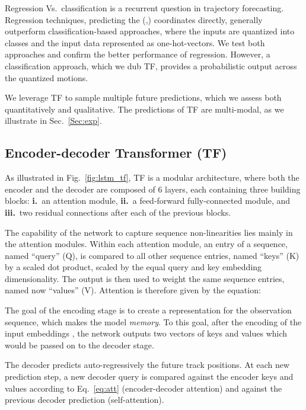 \documentclass[a4paper,conference]{IEEEtran}
\begin{document}
Regression Vs.\ classification is a recurrent question in trajectory forecasting. Regression techniques, predicting the (,) coordinates directly, generally outperform classification-based approaches, where the inputs are quantized into classes and the input data represented as one-hot-vectors. We test both approaches and confirm the better performance of regression. However, a classification approach, which we dub TF, provides a probabilistic output across the quantized motions.

We leverage TF to sample multiple future predictions, which we assess both quantitatively and qualitative. The predictions of TF are multi-modal, as we illustrate in Sec.~\ref{Sec:exp}.










\subsection{Encoder-decoder Transformer (TF)}\label{sec:encdec}

As illustrated in Fig.~\ref{fig:lstm_tf}, TF is a modular architecture, where both the encoder and the decoder are composed of 6 layers, each containing three building blocks: \textbf{i.}\ an attention module, \textbf{ii.}\ a feed-forward fully-connected module, and \textbf{iii.}\ two residual connections after each of the previous blocks.

The capability of the network to capture sequence non-linearities lies mainly in the attention modules. Within each attention module, an entry of a sequence, named ``query'' (Q), is compared to all other sequence entries, named ``keys'' (K) by a scaled dot product, scaled by the equal query and key  embedding dimensionality. The output is then used to weight the same sequence entries, named now ``values'' (V). Attention is therefore given by the equation:


The goal of the encoding stage is to create a representation for the observation sequence, which makes the model \emph{memory}. To this goal, after the encoding of the  input embeddings , the network outputs two vectors of keys  and values  which would be passed on to the decoder stage.

The decoder predicts auto-regressively the future track positions. At each new prediction step, a new decoder query  is compared against the encoder keys  and values  according to Eq.~\eqref{eq:att} (encoder-decoder attention) and against the previous decoder prediction (self-attention).
\end{document}
